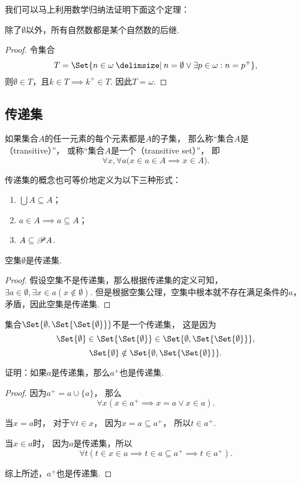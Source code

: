我们可以马上利用数学归纳法证明下面这个定理：
\begin{theorem}
除了\(\emptyset\)以外，所有自然数都是某个自然数的后继.
\begin{proof}
令集合\[
T = \Set{n \in \omega \given n = \emptyset \lor \exists p \in \omega : n = p^+ },
\]
则\(\emptyset \in T\)，且\(k \in T \implies k^+ \in T\).
因此\(T = \omega\).
\end{proof}
\end{theorem}

\subsection{传递集}
\begin{definition}\label{definition:集合论.传递集的定义}
如果集合\(A\)的任一元素的每个元素都是\(A\)的子集，%
那么称“集合\(A\)是（transitive）”，%
或称“集合\(A\)是一个（transitive set）”，%
即\[
\forall x, \forall a \bigl(
x \in a \in A \implies x \in A
\bigr).
\]
\end{definition}
传递集的概念也可等价地定义为以下三种形式：
\begin{enumerate}
	\item \(\bigcup A \subseteq A\)；
	\item \(a \in A \implies a \subseteq A\)；
	\item \(A \subseteq \mathscr{P} A\).
\end{enumerate}

\begin{example}
空集\(\emptyset\)是传递集.
\begin{proof}
假设空集不是传递集，那么根据传递集的定义可知，\(\exists a \in \emptyset, \exists x \in a (x \notin \emptyset)\).
但是根据空集公理，空集中根本就不存在满足条件的\(a\)，矛盾，因此空集是传递集.
\end{proof}
\end{example}

\begin{example}
\def\a{\Set{\emptyset}}%
\def\b{\Set{\a}}%
\def\A{\Set{ \emptyset, \b }}%
集合\(\A\)不是一个传递集，%
这是因为\[
\a \in \b \in \A,
\]\[
\a \notin \A.
\]
\end{example}

\begin{example}
证明：如果\(a\)是传递集，那么\(a^+\)也是传递集.
\begin{proof}
因为\(a^+ = a \cup \{a\}\)，%
那么\[
\forall x( x \in a^+ \implies x = a \lor x \in a ).
\]

当\(x = a\)时，%
对于\(\forall t \in x\)，%
因为\(x = a \subseteq a^+\)，%
所以\(t \in a^+\).

当\(x \in a\)时，%
因为\(a\)是传递集，所以\[
\forall t
(
t \in x \in a
\implies t \in a \subseteq a^+
\implies t \in a^+
).
\]

综上所述，\(a^+\)也是传递集.
\end{proof}
\end{example}

